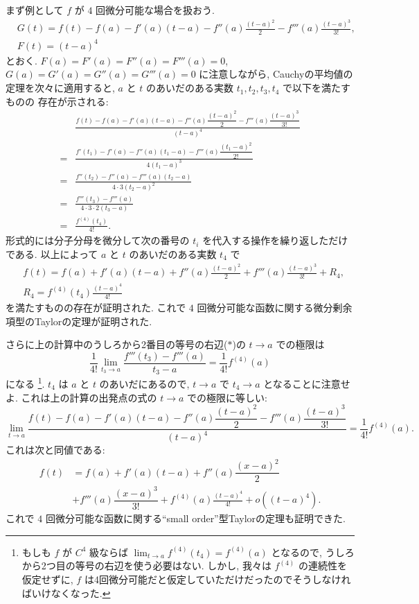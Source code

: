 \documentclass[12pt,twoside]{jarticle}
\theoremstyle{jplain}
\theoremstyle{jplain}
\theoremstyle{jplain}
\numberwithin{theorem}{section}
\numberwithin{equation}{section}
\numberwithin{figure}{section}
\numberwithin{table}{section}
\begin{document}
まず例として $f$ が $4$ 回微分可能な場合を扱おう. 
\begin{align*}
&
G(t)=f(t)-f(a)-f'(a)(t-a)-f''(a)\frac{(t-a)^2}{2}-f'''(a)\frac{(t-a)^3}{3!},
\\ &
F(t)=(t-a)^4
\end{align*}
とおく. $F(a)=F'(a)=F''(a)=F'''(a)=0$, $G(a)=G'(a)=G''(a)=G'''(a)=0$ 
に注意しながら, Cauchyの平均値の定理を次々に適用すると, 
$a$ と $t$ のあいだのある実数 $t_1,t_2,t_3,t_4$ で以下を満たすものの
存在が示される:
\begin{align*}
&
\frac
{f(t)-f(a)-f'(a)(t-a)-f''(a)\dfrac{(t-a)^2}{2}-f'''(a)\dfrac{(t-a)^3}{3!}}
{(t-a)^4}
\\
=&\frac
{f'(t_1)-f'(a)-f''(a)(t_1-a)-f'''(a)\dfrac{(t_1-a)^2}{2!}}
{4(t_1-a)^3}
\\
=&\frac
{f''(t_2)-f''(a)-f'''(a)(t_2-a)}
{4\cdot 3(t_2-a)^2}
\\
=&\frac
{f'''(t_3)-f'''(a)}
{4\cdot 3\cdot 2(t_3-a)}
\tag{$*$}
\\
=&\frac
{f^{(4)}(t_4)}
{4!}.
\end{align*}
形式的には分子分母を微分して次の番号の $t_i$ を代入する操作を繰り返しただけである.
以上によって $a$ と $t$ のあいだのある実数 $t_4$ で
\begin{align*}
&
f(t)=f(a)+f'(a)(t-a)+f''(a)\frac{(t-a)^2}{2}+f'''(a)\frac{(t-a)^3}{3!}+R_4, 
\\ &
R_4=f^{(4)}(t_4)\frac{(t-a)^4}{4!}
\end{align*}
を満たすものの存在が証明された.
これで $4$ 回微分可能な函数に関する微分剰余項型のTaylorの定理が証明された.

さらに上の計算中のうしろから2番目の等号の右辺($*$)の $t\to a$ での極限は
\[
\frac{1}{4!}\lim_{t_3\to a}\frac{f'''(t_3)-f'''(a)}{t_3-a}
=\frac{1}{4!}f^{(4)}(a)
\]
になる%
\footnote{もしも $f$ が $C^4$ 級ならば $\lim_{t\to a}f^{(4)}(t_4)=f^{(4)}(a)$ 
となるので, うしろから2つ目の等号の右辺を使う必要はない.  
しかし, 我々は $f^{(4)}$ の連続性を仮定せずに, 
$f$ は4回微分可能だと仮定していただけだったのでそうしなければいけなくなった.}. 
$t_4$ は $a$ と $t$ のあいだにあるので, $t\to a$ で
$t_4\to a$ となることに注意せよ.
これは上の計算の出発点の式の $t\to a$ での極限に等しい:
\[
\lim_{t\to a}
\frac
{f(t)-f(a)-f'(a)(t-a)-f''(a)\dfrac{(t-a)^2}{2}-f'''(a)\dfrac{(t-a)^3}{3!}}
{(t-a)^4}
=
\frac{1}{4!}f^{(4)}(a).
\]
これは次と同値である:
\begin{align*}
f(t)
&=
f(a)+f'(a)(t-a)+f''(a)\dfrac{(x-a)^2}{2}
\\ &
+f'''(a)\dfrac{(x-a)^3}{3!}
+f^{(4)}(a)\frac{(t-a)^4}{4!}+o((t-a)^4).
\end{align*}
これで $4$ 回微分可能な函数に関する``small order''型Taylorの定理も証明できた.
\end{document}
